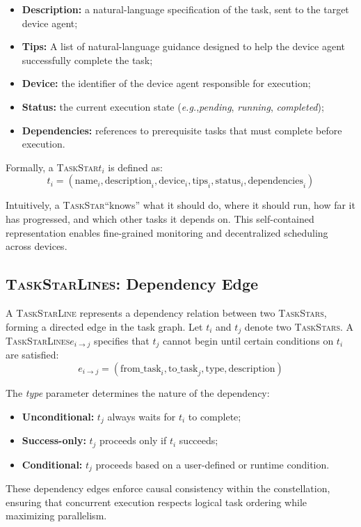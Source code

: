 \documentclass[10pt]{article} %
\newcommand{\TaskStar}{\textsc{TaskStar}\xspace}
\newcommand{\TaskStars}{\textsc{TaskStars}\xspace}
\newcommand{\TaskStarLine}{\textsc{TaskStarLine}\xspace}
\newcommand{\TaskStarLines}{\textsc{TaskStarLines}\xspace}
\newcommand{\eg}{\textit{e.g.},\xspace}
\begin{document}
\begin{itemize}
    \item \textbf{Description:} a natural-language specification of the task, sent to the target device agent;
    \item \textbf{Tips:} A list of natural-language guidance designed to help the device agent successfully complete the task;
    \item \textbf{Device:} the identifier of the device agent responsible for execution;
    \item \textbf{Status:} the current execution state (\eg \textit{pending}, \textit{running}, \textit{completed});
    \item \textbf{Dependencies:} references to prerequisite tasks that must complete before execution.
\end{itemize}

Formally, a \TaskStar $t_i$ is defined as:
\[
t_i = (\text{name}_i, \text{description}_i, \text{device}_i, \text{tips}_i, \text{status}_i, \text{dependencies}_i)
\]

Intuitively, a \TaskStar ``knows'' what it should do, where it should run, how far it has progressed, and which other tasks it depends on. This self-contained representation enables fine-grained monitoring and decentralized scheduling across devices.

\subsection{\TaskStarLines: Dependency Edge}
\label{subsec:taskstarline}

A \TaskStarLine represents a dependency relation between two \TaskStars, forming a directed edge in the task graph. Let $t_i$ and $t_j$ denote two \TaskStars. A \TaskStarLines $e_{i \rightarrow j}$ specifies that $t_j$ cannot begin until certain conditions on $t_i$ are satisfied:
\[
e_{i \rightarrow j} = (\text{from\_task}_i, \text{to\_task}_j, \text{type}, \text{description})
\]

The \textit{type} parameter determines the nature of the dependency:
\begin{itemize}
    \item \textbf{Unconditional:} $t_j$ always waits for $t_i$ to complete;
    \item \textbf{Success-only:} $t_j$ proceeds only if $t_i$ succeeds;
    \item \textbf{Conditional:} $t_j$ proceeds based on a user-defined or runtime condition.
\end{itemize}
These dependency edges enforce causal consistency within the constellation, ensuring that concurrent execution respects logical task ordering while maximizing parallelism.
\end{document}

